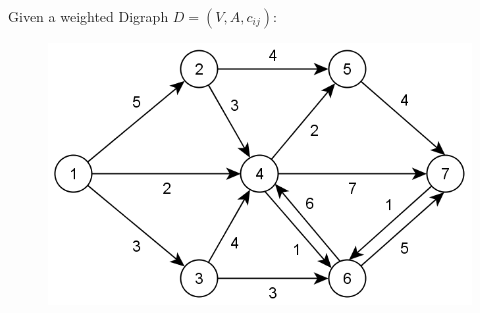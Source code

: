 Given a weighted Digraph $D = (V,A,c_{ij})$:
\begin{figure}[ht]%
\centering
\includegraphics[scale=.2]{Uebungen/figures/digraph}%
\end{figure}

